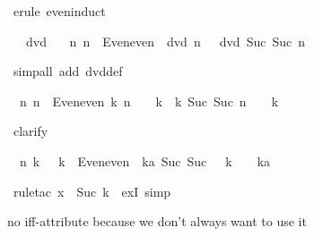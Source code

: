 \begin{isabellebody}
\isamarkupfalse%
\ {\isacharparenleft}erule\ even{\isachardot}induct{\isacharparenright}\isamarkupfalse%
%
\begin{isamarkuptxt}%
\begin{isabelle}%
\ {}{\isachardot}\ {}\ dvd\ {}\isanewline
\ {}{\isachardot}\ {\isasymAnd}n{\isachardot}\ {\isasymlbrakk}n\ {\isasymin}\ Even{\isachardot}even{\isacharsemicolon}\ {}\ dvd\ n{\isasymrbrakk}\ {\isasymLongrightarrow}\ {}\ dvd\ Suc\ {\isacharparenleft}Suc\ n{\isacharparenright}%
\end{isabelle}%
\end{isamarkuptxt}%
\isamarkuptrue%
\ {\isacharparenleft}simp{\isacharunderscore}all\ add{\isacharcolon}\ dvd{\isacharunderscore}def{\isacharparenright}\isamarkupfalse%
%
\begin{isamarkuptxt}%
\begin{isabelle}%
\ {}{\isachardot}\ {\isasymAnd}n{\isachardot}\ {\isasymlbrakk}n\ {\isasymin}\ Even{\isachardot}even{\isacharsemicolon}\ {\isasymexists}k{\isachardot}\ n\ {\isacharequal}\ {}\ {\isacharasterisk}\ k{\isasymrbrakk}\ {\isasymLongrightarrow}\ {\isasymexists}k{\isachardot}\ Suc\ {\isacharparenleft}Suc\ n{\isacharparenright}\ {\isacharequal}\ {}\ {\isacharasterisk}\ k%
\end{isabelle}%
\end{isamarkuptxt}%
\isamarkuptrue%
\ clarify\isamarkupfalse%
%
\begin{isamarkuptxt}%
\begin{isabelle}%
\ {}{\isachardot}\ {\isasymAnd}n\ k{\isachardot}\ {}\ {\isacharasterisk}\ k\ {\isasymin}\ Even{\isachardot}even\ {\isasymLongrightarrow}\ {\isasymexists}ka{\isachardot}\ Suc\ {\isacharparenleft}Suc\ {\isacharparenleft}{}\ {\isacharasterisk}\ k{\isacharparenright}{\isacharparenright}\ {\isacharequal}\ {}\ {\isacharasterisk}\ ka%
\end{isabelle}%
\end{isamarkuptxt}%
\isamarkuptrue%
\ {\isacharparenleft}rule{\isacharunderscore}tac\ x\ {\isacharequal}\ {\isachardoublequote}Suc\ k{\isachardoublequote}\ \ exI{\isacharcomma}\ simp{\isacharparenright}\isanewline
\isamarkupfalse%
\isamarkupfalse%
%
\begin{isamarkuptext}%
no iff-attribute because we don't always want to use it%
\end{isamarkuptext}%

\end{isabellebody}
